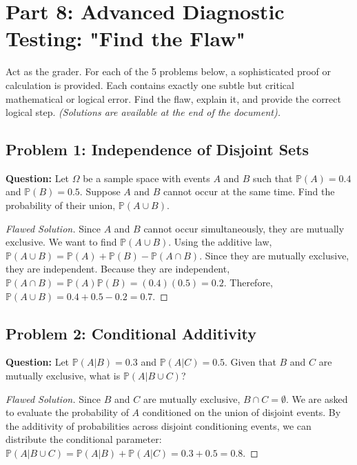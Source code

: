 \documentclass[12pt, a4paper]{article}
\theoremstyle{definition}
\theoremstyle{remark}
\newcommand{\Prob}{\mathbb{P}}
\newcommand{\W}{\Omega}
\newcommand{\1}{\mathbf{1}}
\begin{document}
\newpage

\section{Part 8: Advanced Diagnostic Testing: "Find the Flaw"}
Act as the grader. For each of the 5 problems below, a sophisticated proof or calculation is provided. Each contains exactly one subtle but critical mathematical or logical error. Find the flaw, explain it, and provide the correct logical step. \textit{(Solutions are available at the end of the document).}

\subsection*{Problem 1: Independence of Disjoint Sets}
\textbf{Question:} Let $\W$ be a sample space with events $A$ and $B$ such that $\Prob(A) = 0.4$ and $\Prob(B) = 0.5$. Suppose $A$ and $B$ cannot occur at the same time. Find the probability of their union, $\Prob(A \cup B)$.
\begin{proof}[Flawed Solution]
Since $A$ and $B$ cannot occur simultaneously, they are mutually exclusive. We want to find $\Prob(A \cup B)$. 
Using the additive law, $\Prob(A \cup B) = \Prob(A) + \Prob(B) - \Prob(A \cap B)$.
Since they are mutually exclusive, they are independent. 
Because they are independent, $\Prob(A \cap B) = \Prob(A)\Prob(B) = (0.4)(0.5) = 0.2$.
Therefore, $\Prob(A \cup B) = 0.4 + 0.5 - 0.2 = 0.7$.
\end{proof}

\subsection*{Problem 2: Conditional Additivity}
\textbf{Question:} Let $\Prob(A|B) = 0.3$ and $\Prob(A|C) = 0.5$. Given that $B$ and $C$ are mutually exclusive, what is $\Prob(A | B \cup C)$?
\begin{proof}[Flawed Solution]
Since $B$ and $C$ are mutually exclusive, $B \cap C = \emptyset$. We are asked to evaluate the probability of $A$ conditioned on the union of disjoint events. By the additivity of probabilities across disjoint conditioning events, we can distribute the conditional parameter:
$\Prob(A | B \cup C) = \Prob(A|B) + \Prob(A|C) = 0.3 + 0.5 = 0.8$.
\end{proof}
\end{document}
